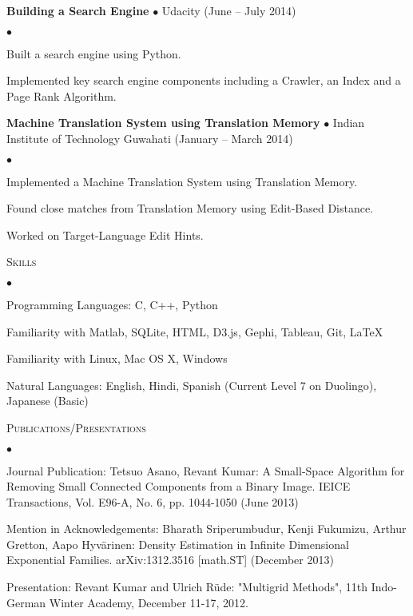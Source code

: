 \documentclass[10pt]{article}
\newcommand{\lineunder}{\\\vspace{-9pt}\hrulefill}
\newcommand{\header}[1]{{\normalsize\scshape{#1}} \lineunder}
\newcommand{\project}[3]{{ \textbf{#1} $\bullet$ #2 \hfill (#3)\\  }}
\newenvironment{achievements}{\begin{list}{$\bullet$}{\topsep 0pt \itemsep 0pt}}{\end{list}}
\begin{document}
\project{Building a Search Engine}{Udacity}{June -- July 2014}
	\begin{achievements}
	\item Built a search engine using Python.
	\item Implemented key search engine components including a Crawler, an Index and a Page Rank Algorithm.
	\end{achievements}
	
\project{Machine Translation System using Translation Memory}{Indian Institute of Technology Guwahati}{January -- March 2014}
	\begin{achievements}
	\item Implemented a Machine Translation System using Translation Memory.
	\item Found close matches from Translation Memory using Edit-Based Distance.
	\item Worked on Target-Language Edit Hints.
	\end{achievements}	
	
\vspace{3pt}



\header{Skills}
\begin{achievements}
\item Programming Languages: C, C++, Python
\item Familiarity with Matlab, SQLite, HTML, D3.js, Gephi, Tableau, Git, \LaTeX
\item Familiarity with Linux, Mac OS X, Windows
\item Natural Languages: English, Hindi, Spanish (Current Level 7 on Duolingo), Japanese (Basic)
\end{achievements}
	
\vspace{3pt}
	
\header{Publications/Presentations}
\begin{achievements}
\item Journal Publication: Tetsuo Asano, Revant Kumar: A Small-Space Algorithm for Removing Small Connected Components from a Binary Image. IEICE Transactions, Vol. E96-A, No. 6, pp. 1044-1050 (June 2013)
\item Mention in Acknowledgements: Bharath Sriperumbudur, Kenji Fukumizu, Arthur Gretton, Aapo Hyv\"{a}rinen: Density Estimation in Infinite Dimensional Exponential Families. arXiv:1312.3516 [math.ST] (December 2013)
\item Presentation: Revant Kumar and Ulrich R\"{u}de: "Multigrid Methods", 11th Indo-German Winter Academy, December 11-17, 2012.
\end{achievements} 
\end{document}
